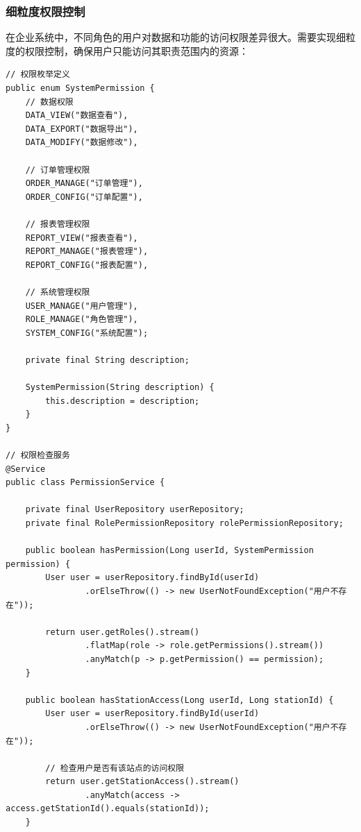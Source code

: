\hypertarget{ux7ec6ux7c92ux5ea6ux6743ux9650ux63a7ux5236}{%
\subsubsection{细粒度权限控制}\label{ux7ec6ux7c92ux5ea6ux6743ux9650ux63a7ux5236}}

在企业系统中，不同角色的用户对数据和功能的访问权限差异很大。需要实现细粒度的权限控制，确保用户只能访问其职责范围内的资源：

\begin{lstlisting}[style=java]
// 权限枚举定义
public enum SystemPermission {
    // 数据权限
    DATA_VIEW("数据查看"),
    DATA_EXPORT("数据导出"),
    DATA_MODIFY("数据修改"),
    
    // 订单管理权限
    ORDER_MANAGE("订单管理"),
    ORDER_CONFIG("订单配置"),
    
    // 报表管理权限
    REPORT_VIEW("报表查看"),
    REPORT_MANAGE("报表管理"),
    REPORT_CONFIG("报表配置"),
    
    // 系统管理权限
    USER_MANAGE("用户管理"),
    ROLE_MANAGE("角色管理"),
    SYSTEM_CONFIG("系统配置");
    
    private final String description;
    
    SystemPermission(String description) {
        this.description = description;
    }
}

// 权限检查服务
@Service
public class PermissionService {
    
    private final UserRepository userRepository;
    private final RolePermissionRepository rolePermissionRepository;
    
    public boolean hasPermission(Long userId, SystemPermission permission) {
        User user = userRepository.findById(userId)
                .orElseThrow(() -> new UserNotFoundException("用户不存在"));
                
        return user.getRoles().stream()
                .flatMap(role -> role.getPermissions().stream())
                .anyMatch(p -> p.getPermission() == permission);
    }
    
    public boolean hasStationAccess(Long userId, Long stationId) {
        User user = userRepository.findById(userId)
                .orElseThrow(() -> new UserNotFoundException("用户不存在"));
                
        // 检查用户是否有该站点的访问权限
        return user.getStationAccess().stream()
                .anyMatch(access -> access.getStationId().equals(stationId));
    }
    

\end{lstlisting}
